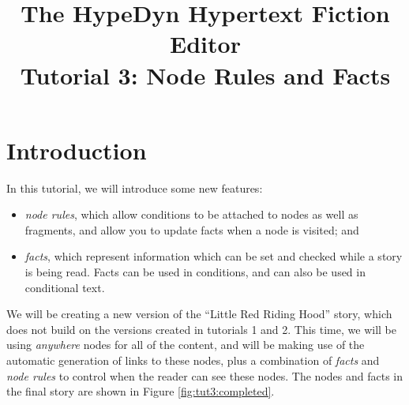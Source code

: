 \documentclass{article}
\begin{document}
\title{The HypeDyn Hypertext Fiction Editor\\Tutorial 3: Node Rules and Facts}
\date{}

\onecolumn
\maketitle

\tableofcontents

\section{Introduction}
In this tutorial, we will introduce some new features:

\begin{itemize}
  \item \textit{node rules}, which allow conditions to be attached to nodes as well
  as fragments, and allow you to update facts when a node is visited; and
  \item \textit{facts}, which represent information which can be set and checked while a story is being read. Facts can be used in conditions, and can also be used in conditional text.
\end{itemize}



\noindent We will be creating a new version of the ``Little Red Riding Hood'' story, which does not build on the versions created in tutorials 1 and 2. This time, we will be using \textit{anywhere} nodes for all of the content, and will be making use of the automatic generation of links to these nodes, plus a combination of \textit{facts} and \textit{node rules} to control when the reader can see these nodes. The nodes and facts in the final story are shown in Figure \ref{fig:tut3:completed}.
\end{document}
